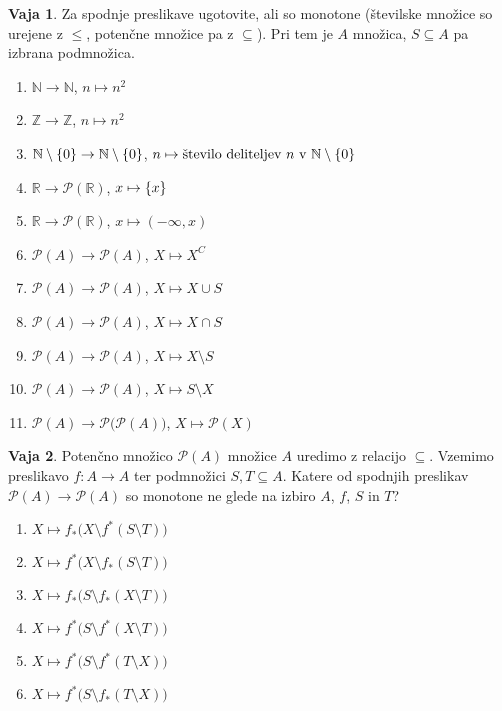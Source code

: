 \documentclass{article}
\newcommand{\pow}{\mathcal{P}}
\newcommand{\NN}{\mathbb{N}}
\newcommand{\ZZ}{\mathbb{Z}}
\newcommand{\RR}{\mathbb{R}}
\theoremstyle{definition}
\newtheorem{vaja}{Vaja}
\begin{document}
\begin{vaja}
  Za spodnje preslikave ugotovite, ali so monotone (številske množice so urejene z $\leq$, potenčne množice pa z $\subseteq$). Pri tem je $A$ množica, $S \subseteq A$ pa izbrana podmnožica.
  \begin{enumerate}
    \item
      $\NN \to \NN$, $n \mapsto n^2$
    \item
      $\ZZ \to \ZZ$, $n \mapsto n^2$
    \item
      $\NN \setminus \set{0} \to \NN \setminus \set{0}$, $n \mapsto \text{število deliteljev $n$ v $\NN \setminus \set{0}$}$
    \item
      $\RR \to \pow(\RR)$, $x \mapsto \set{x}$
    \item
      $\RR \to \pow(\RR)$, $x \mapsto (-\infty, x)$
    \item
      $\pow(A) \to \pow(A)$, $X \mapsto X^C$
    \item
      $\pow(A) \to \pow(A)$, $X \mapsto X \cup S$
    \item
      $\pow(A) \to \pow(A)$, $X \mapsto X \cap S$
    \item
      $\pow(A) \to \pow(A)$, $X \mapsto X \setminus S$
    \item
      $\pow(A) \to \pow(A)$, $X \mapsto S \setminus X$
    \item
      $\pow(A) \to \pow\big(\pow(A)\big)$, $X \mapsto \pow(X)$
  \end{enumerate}
\end{vaja}

\begin{vaja}
  Potenčno množico $\pow(A)$ množice $A$ uredimo z relacijo $\subseteq$. Vzemimo preslikavo $f\colon A \to A$ ter podmnožici $S, T \subseteq A$. Katere od spodnjih preslikav $\pow(A) \to \pow(A)$ so monotone ne glede na izbiro $A$, $f$, $S$ in $T$?
  \begin{enumerate}
    \item $X \mapsto f_*\big(X \setminus f^*(S \setminus T)\big)$
    \item $X \mapsto f^*\big(X \setminus f_*(S \setminus T)\big)$
    \item $X \mapsto f_*\big(S \setminus f_*(X \setminus T)\big)$
    \item $X \mapsto f^*\big(S \setminus f^*(X \setminus T)\big)$
    \item $X \mapsto f^*\big(S \setminus f^*(T \setminus X)\big)$
    \item $X \mapsto f^*\big(S \setminus f_*(T \setminus X)\big)$
  \end{enumerate}
\end{vaja}
\end{document}
